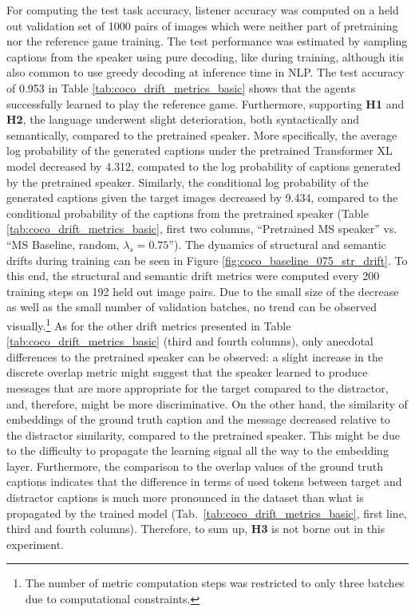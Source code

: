 For computing the test task accuracy, listener accuracy was computed on a held out validation set of 1000 pairs of images which were neither part of pretraining nor the reference game training.  The test performance was estimated by sampling captions from the speaker using pure decoding, like during training, although itis also common to use greedy decoding at inference time in NLP. The test accuracy of 0.953 in Table \ref{tab:coco_drift_metrics_basic} shows that the agents successfully learned to play the reference game. Furthermore, supporting \textbf{H1} and \textbf{H2}, the language underwent slight deterioration, both syntactically and semantically, compared to the pretrained speaker. More specifically, the average log probability of the generated captions under the pretrained Transformer XL model decreased by 4.312, compated to the log probability of captions generated by the pretrained speaker. Similarly, the conditional log probability of the generated captions given the target images decreased by 9.434, compared to the conditional probability of the captions from the pretrained speaker (Table \ref{tab:coco_drift_metrics_basic}, first two columns, ``Pretrained MS speaker'' vs. ``MS Baseline, random, $\lambda_s=0.75$''). The dynamics of structural and semantic drifts during training can be seen in Figure \ref{fig:coco_baseline_075_str_drift}. To this end, the structural and semantic drift metrics were computed every 200 training steps on 192 held out image pairs. Due to the small size of the decrease as well as the small number of validation batches, no trend can be observed visually.\footnote{The number of metric computation steps was restricted to only three batches due to computational constraints.} 
As for the other drift metrics presented in Table \ref{tab:coco_drift_metrics_basic} (third and fourth columns), only anecdotal differences to the pretrained speaker can be observed: a slight increase in the discrete overlap metric might suggest that the speaker learned to produce messages that are more appropriate for the target compared to the distractor, and, therefore, might be more discriminative. On the other hand, the similarity of embeddings of the ground truth caption and the message decreased relative to the distractor similarity, compared to the pretrained speaker. This might be due to the difficulty to propagate the learning signal all the way to the embedding layer. Furthermore, the comparison to the overlap values of the ground truth captions indicates that the difference in terms of used tokens between target and distractor captions is much more pronounced in the dataset than what is propagated by the trained model (Tab.~\ref{tab:coco_drift_metrics_basic}, first line, third and fourth columns).  
Therefore, to sum up, \textbf{H3} is not borne out in this experiment.

